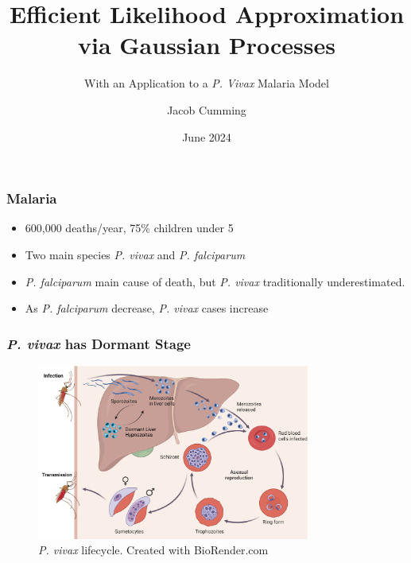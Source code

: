 \documentclass{beamer}
\title{Efficient Likelihood Approximation via Gaussian Processes}
\subtitle{With an Application to a \emph{P. Vivax} Malaria Model}
\author{Jacob Cumming}
\institute{University of Melbourne, Walter and Eliza Hall Institute}
\date{June 2024}
\begin{document}
\frame{\titlepage}


\begin{frame}
    \frametitle{Malaria}
    \begin{itemize}
        \item 600,000 deaths/year, 75\% children under 5
        \item Two main species \emph{P. vivax} and \emph{P. falciparum}
        \item \emph{P. falciparum} main cause of death, but
              \emph{P. vivax} traditionally underestimated.
        \item As \emph{P. falciparum} decrease, \emph{P. vivax} cases increase
    \end{itemize}
\end{frame}

\begin{frame}
    \frametitle{\emph{P. vivax} has Dormant Stage}
    \begin{figure}
        \centering
        \includegraphics[width=0.8\textwidth]{vivax_lifecycle_full.pdf}
        \caption{\emph{P. vivax} lifecycle. Created with BioRender.com}
    \end{figure}
\end{frame}
\end{document}
